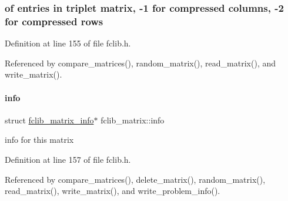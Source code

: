 \subsubsection*{of entries in triplet matrix, -\/1 for compressed columns, -\/2 for compressed rows}



Definition at line 155 of file fclib.\+h.



Referenced by compare\+\_\+matrices(), random\+\_\+matrix(), read\+\_\+matrix(), and write\+\_\+matrix().

\mbox{\label{structfclib__matrix_ac0af227334c5b0a13a3222c8f04add36}} 
\paragraph{\texorpdfstring{info}{info}}
{\footnotesize\ttfamily struct \mbox{\hyperlink{structfclib__matrix__info}{fclib\+\_\+matrix\+\_\+info}}$\ast$ fclib\+\_\+matrix\+::info}



info for this matrix 



Definition at line 157 of file fclib.\+h.



Referenced by compare\+\_\+matrices(), delete\+\_\+matrix(), random\+\_\+matrix(), read\+\_\+matrix(), write\+\_\+matrix(), and write\+\_\+problem\+\_\+info().

